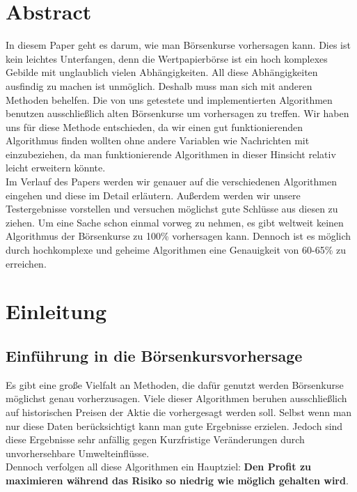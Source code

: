 \documentclass[12pt]{article} %
\begin{document}

\tableofcontents %

\newpage %

\section{Abstract}

In diesem Paper geht es darum, wie man Börsenkurse vorhersagen kann. Dies ist kein leichtes Unterfangen, denn die Wertpapierbörse ist ein hoch komplexes Gebilde mit unglaublich vielen Abhängigkeiten. All diese Abhängigkeiten ausfindig zu machen ist unmöglich. Deshalb muss man sich mit anderen Methoden behelfen. Die von uns getestete und implementierten Algorithmen benutzen ausschließlich alten Börsenkurse um vorhersagen zu treffen. Wir haben uns für diese Methode entschieden, da wir einen gut funktionierenden Algorithmus finden wollten ohne andere Variablen wie Nachrichten mit einzubeziehen, da man funktionierende Algorithmen in dieser Hinsicht relativ leicht erweitern könnte.\\
Im Verlauf des Papers werden wir genauer auf die verschiedenen Algorithmen eingehen und diese im Detail erläutern. Außerdem werden wir unsere Testergebnisse vorstellen und versuchen möglichst gute Schlüsse aus diesen zu ziehen. Um eine Sache schon einmal vorweg zu nehmen, es gibt weltweit keinen Algorithmus der Börsenkurse zu 100\% vorhersagen kann. Dennoch ist es möglich durch hochkomplexe und geheime Algorithmen eine Genauigkeit von 60-65\% zu erreichen. 

\section{Einleitung}
\label{introduction}
\subsection{Einführung in die Börsenkursvorhersage}

Es gibt eine große Vielfalt an Methoden, die dafür genutzt werden Börsenkurse möglichst genau vorherzusagen. Viele dieser Algorithmen beruhen ausschließlich auf historischen Preisen der Aktie die vorhergesagt werden soll. Selbst wenn man nur diese Daten berücksichtigt kann man gute Ergebnisse erzielen. Jedoch sind diese Ergebnisse sehr anfällig gegen Kurzfristige Veränderungen durch unvorhersehbare Umwelteinflüsse.\\
Dennoch verfolgen all diese Algorithmen ein Hauptziel: \textbf{Den Profit zu maximieren während das Risiko so niedrig wie möglich gehalten wird}.
\end{document}
